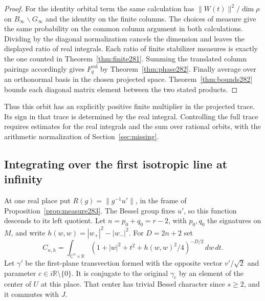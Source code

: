 \documentclass[a4paper,11pt]{article}
\theoremstyle{definition}
\theoremstyle{remark}
\newcommand{\RR}{\mathbb R}\newcommand{\CC}{\mathbb C}\newcommand{\QQ}{\mathbb Q}
\numberwithin{equation}{section}
\begin{document}
\begin{proof}
For the identity orbital term the same calculation has
\(\|W(t)\|^2/\dim\rho\) on \(B_\infty\backslash G_\infty\)
and the identity on the finite columns. The choices of
measure give the same probability on the common column
argument in both calculations. Dividing by the diagonal
normalization cancels the dimension and leaves the displayed
ratio of real integrals. Each ratio of finite stabilizer
measures is exactly the one counted in
Theorem~\ref{thm:finite281}. Summing the translated column
pairings accordingly gives \(F_q^{\mathrm{col}}\) by
Theorem~\ref{thm:phase282}. Finally average over an
orthonormal basis in the chosen projected space.
Theorem~\ref{thm:bounds282} bounds each diagonal matrix
element between the two stated products.
\end{proof}

Thus this orbit has an explicitly positive finite multiplier
in the projected trace. Its sign in that trace is determined
by the real integral. Controlling the full trace requires
estimates for the real integrals and the sum over rational
orbits, with the arithmetic normalization of Section~\ref{sec:missing}.

\subsection{Integrating over the first isotropic line at infinity}\label{nav:VII-51}
At one real place put \(R(g)=\|g^{-1}u'\|\), in the frame
of Proposition~\ref{prop:measure283}. The Bessel group fixes
\(u'\), so this function descends to its left quotient.
Let \(n=p_0+q_0=r-2\), with \(p_0,q_0\) the signatures
on \(M\), and write \(h(w,w)=|w_+|^2-|w_-|^2\).
For \(D=2n+2\) set
\[
 C_{n,h}=\int_{\CC^n\times\RR}
   (1+|w|^2+t^2+h(w,w)^2/4)^{-D/2}\,dw\,dt .
\]
Let \(\gamma'\) be the first-plane transvection formed
with the opposite vector \(v'/\sqrt2\) and parameter
\(c\in i\RR\setminus\{0\}\). It is conjugate to the
original \(\gamma_c\) by an element of the center of \(U\)
at this place. That center has trivial Bessel character
since \(s\ge2\), and it commutes with \(J\).
\end{document}
